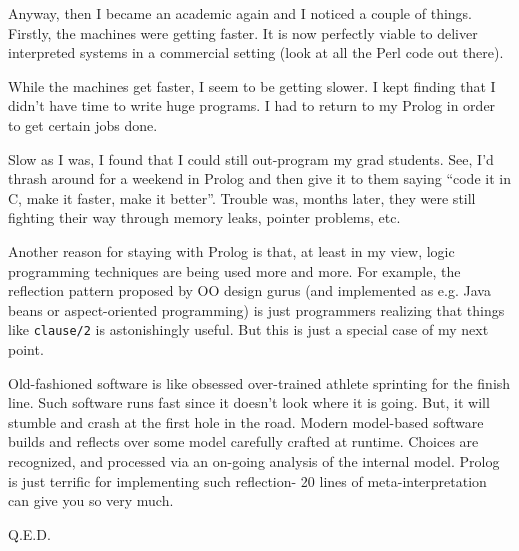 Anyway, then I became an academic again and I noticed a couple of things. Firstly,
the machines were getting faster. It is now perfectly viable to deliver interpreted systems in a commercial setting
(look at all the Perl code out there).

While the machines get faster, I seem to be getting slower. I kept finding that I
didn't have time to write huge programs.
I had to return to my Prolog in order to get certain jobs done.

Slow as I was, I found that I could still out-program my
grad students.
See, I'd thrash around for a weekend
in Prolog and then give it to them saying ``code it in C, make it faster,
make it better''. Trouble was, months later, they were still fighting their way through memory
leaks, pointer problems, etc.

Another reason for staying with Prolog is that,
at least in my view,  logic programming techniques are being used more and more.
For example, the reflection pattern proposed by OO design gurus (and implemented as e.g.
Java beans or aspect-oriented programming)
is just programmers realizing that things like {\tt clause/2} is astonishingly useful. But this is
just a special case of my next point.

Old-fashioned software is like obsessed over-trained athlete
sprinting for the finish line. Such software runs fast since it
doesn't look where it is going. But, it  will stumble and crash at
the first  hole in the road. Modern model-based software builds
and reflects over some model carefully crafted at runtime. Choices
are recognized, and processed  via an on-going  analysis of the
internal model. Prolog is just  terrific for implementing such
reflection- 20 lines of meta-interpretation can give you so very
much.

Q.E.D.
